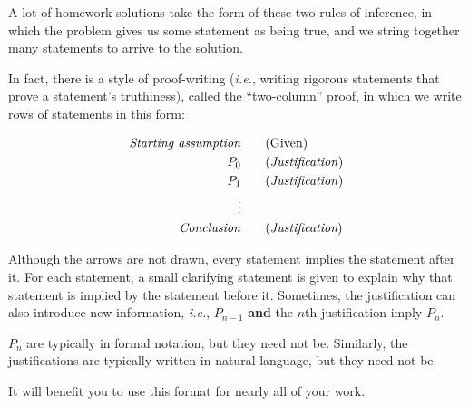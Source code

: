 \documentclass[letterpaper,twoside]{article}
\def\SmallHSpace{\hspace*{1mm}}
\newcommand\Ie[1]{\textit{i.e.}, #1}
\newcommand{\Paradox}[1]{%
    \emoji{police-car-light} \textbf{Paradox.}\SmallHSpace #1 \hfill $\square$
}
\begin{document}
\begin{multicols}{2}

A lot of homework solutions take the form of these two rules of inference, in which the problem gives us some statement as being true, and we string together many statements to arrive to the solution.

In fact, there is a style of proof-writing (\Ie{writing rigorous statements that prove a statement's truthiness}), called the  ``two-column'' proof, in which we write rows of statements in this form:

\begin{align*}
    \text{\textit{Starting assumption}}&   \hspace{0.125in} &&(\text{Given})\\
    P_0& &&(\text{\textit{Justification}})\\
    P_1& &&(\text{\textit{Justification}})\\
    \vdots& \\
    \text{\textit{Conclusion}}& &&(\textit{\text{Justification}})\\
\end{align*}

Although the arrows are not drawn, every statement implies the statement after it.
For each statement, a small clarifying statement is given to explain why that statement is implied by the statement before it.
Sometimes, the justification can also introduce new information, \Ie{$P_{n - 1}$ \textbf{and} the $n$th justification imply $P_n$}.

$P_n$ are typically in formal notation, but they need not be.
Similarly, the justifications are typically written in natural language, but they need not be.

It will benefit you to use this format for nearly all of your work.





\end{multicols}
\end{document}
